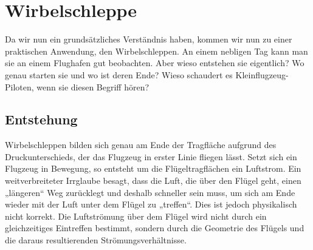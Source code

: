 %
%
%
\section{Wirbelschleppe}
Da wir nun ein grundsätzliches Verständnis haben, kommen wir nun zu einer praktischen Anwendung, den Wirbelschleppen.
An einem nebligen Tag kann man sie an einem Flughafen gut beobachten. 
Aber wieso entstehen sie eigentlich? 
Wo genau starten sie und wo ist deren Ende?
Wieso schaudert es Kleinflugzeug-Piloten, wenn sie diesen Begriff hören?


\subsection{Entstehung}
Wirbelschleppen bilden sich genau am Ende der Tragfläche aufgrund des Druckunterschieds, der das Flugzeug in erster Linie fliegen lässt.
Setzt sich ein Flugzeug in Bewegung, so entsteht um die Flügeltragflächen ein Luftstrom.
Ein weitverbreiteter Irrglaube besagt, dass die Luft, die über den Flügel geht, einen „längeren“ Weg zurücklegt und deshalb schneller sein muss, um sich am Ende wieder mit der Luft unter dem Flügel zu „treffen“.
Dies ist jedoch physikalisch nicht korrekt.
Die Luftströmung über dem Flügel wird nicht durch ein gleichzeitiges Eintreffen bestimmt, sondern durch die Geometrie des Flügels und die daraus resultierenden Strömungsverhältnisse.

